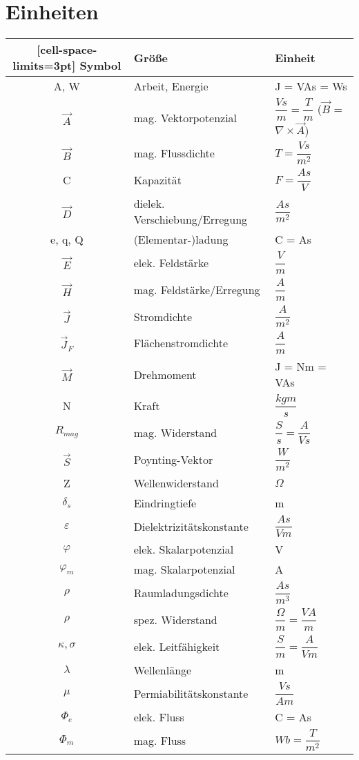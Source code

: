 \section{Einheiten}
\begin{NiceTabular}{c|l|l}[cell-space-limits=3pt]
    \hline
    Symbol & Größe & Einheit\\
    \hline 
    A, W & Arbeit, Energie & J = VAs = Ws\\
    $\vec{A}$ & mag. Vektorpotenzial & $\dfrac{Vs}{m} = \dfrac{T}{m}$ ($\vec{B}$ = $\nabla \times \vec{A}$)\\
    $\vec{B}$ & mag. Flussdichte & $T = \dfrac{Vs}{m^2}$\\
    C & Kapazität & $F = \dfrac{As}{V}$\\
    $\vec{D}$ & dielek. Verschiebung/Erregung & $\dfrac{As}{m^2}$\\
    e, q, Q & (Elementar-)ladung & C = As\\
    $\vec{E}$ & elek. Feldstärke & $\dfrac{V}{m}$ \\
    $\vec{H}$ & mag. Feldstärke/Erregung & $\dfrac{A}{m}$\\
    $\vec{J}$ & Stromdichte & $\dfrac{A}{m^2}$\\
    $\vec{J}_F$ & Flächenstromdichte & $\dfrac{A}{m}$\\
    $\vec{M}$ & Drehmoment & J = Nm = VAs\\
    N & Kraft & $\dfrac{kgm}{s}$\\
    $R_{mag}$ & mag. Widerstand & $\dfrac{S}{s} = \dfrac{A}{Vs}$\\
    $\vec{S}$ & Poynting-Vektor & $\dfrac{W}{m^2}$\\
    Z & Wellenwiderstand & $\Omega$\\
    $\delta_s$ & Eindringtiefe & m \\
    $\varepsilon$ & Dielektrizitätskonstante & $\dfrac{As}{Vm}$\\
    $\varphi$ & elek. Skalarpotenzial & V \\
    $\varphi_m$ & mag. Skalarpotenzial & A \\
    $\rho$ & Raumladungsdichte & $\dfrac{As}{m^3}$\\
    $\rho$ & spez. Widerstand & $\dfrac{\Omega}{m} = \dfrac{VA}{m}$\\
    $\kappa, \sigma$ & elek. Leitfähigkeit & $\dfrac{S}{m} = \dfrac{A}{Vm}$\\
    $\lambda$ & Wellenlänge & m\\
    $\mu$ & Permiabilitätskonstante & $\dfrac{Vs}{Am}$\\
    $\Phi_e$ & elek. Fluss & C = As\\
    $\Phi_m$ & mag. Fluss & $Wb = \dfrac{T}{m^2}$\\

    \hline
\end{NiceTabular}
    